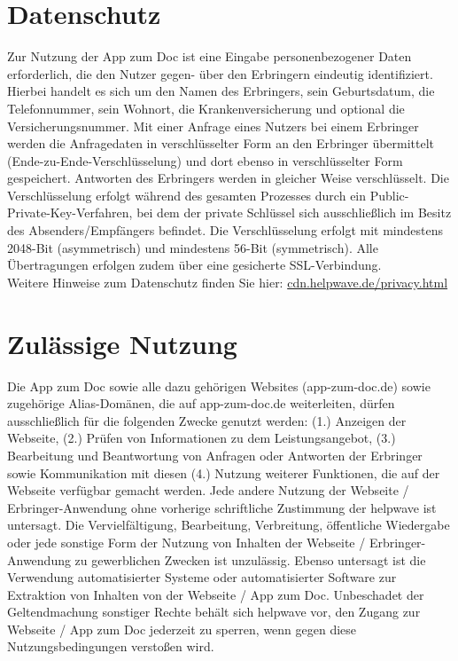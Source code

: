 \documentclass[10pt]{article}
\begin{document}
\section{Datenschutz}
Zur Nutzung der App zum Doc ist eine Eingabe personenbezogener Daten erforderlich, die den Nutzer gegen-
über den Erbringern eindeutig identifiziert. Hierbei handelt es sich um den Namen des Erbringers, sein Geburtsdatum, die Telefonnummer, sein Wohnort, die Krankenversicherung und optional die Versicherungsnummer.
Mit einer Anfrage eines Nutzers bei einem Erbringer werden die Anfragedaten in verschlüsselter Form an den Erbringer
übermittelt (Ende-zu-Ende-Verschlüsselung) und dort ebenso in verschlüsselter Form gespeichert. Antworten des Erbringers werden in gleicher Weise verschlüsselt. Die Verschlüsselung erfolgt während des gesamten Prozesses durch ein Public-
Private-Key-Verfahren, bei dem der private Schlüssel sich ausschließlich im Besitz des Absenders/Empfängers befindet. Die
Verschlüsselung erfolgt mit mindestens 2048-Bit (asymmetrisch) und mindestens 56-Bit (symmetrisch). Alle Übertragungen
erfolgen zudem über eine gesicherte SSL-Verbindung. \\

Weitere Hinweise zum Datenschutz finden Sie hier: \href{https://cdn.helpwave.de/privacy.html}{cdn.helpwave.de/privacy.html}

\section{Zulässige Nutzung}
Die App zum Doc sowie alle dazu gehörigen Websites (app-zum-doc.de) sowie zugehörige Alias-Domänen,
die auf app-zum-doc.de weiterleiten, dürfen ausschließlich für die folgenden Zwecke genutzt werden:
(1.) Anzeigen der Webseite, (2.) Prüfen von Informationen zu dem Leistungsangebot, (3.) Bearbeitung und Beantwortung von Anfragen oder Antworten der Erbringer sowie Kommunikation mit diesen (4.) Nutzung weiterer Funktionen, die auf der Webseite verfügbar gemacht werden. Jede andere Nutzung der Webseite / Erbringer-Anwendung ohne vorherige schriftliche Zustimmung der helpwave ist untersagt. Die Vervielfältigung, Bearbeitung, Verbreitung, öffentliche Wiedergabe oder jede sonstige Form der Nutzung von Inhalten der Webseite / Erbringer-Anwendung zu gewerblichen Zwecken ist unzulässig. Ebenso untersagt ist die Verwendung automatisierter Systeme oder automatisierter Software zur Extraktion von Inhalten von der Webseite / App zum Doc. Unbeschadet der Geltendmachung sonstiger Rechte behält sich helpwave vor, den Zugang zur Webseite / App zum Doc jederzeit zu sperren, wenn gegen diese Nutzungsbedingungen verstoßen wird.
\end{document}
